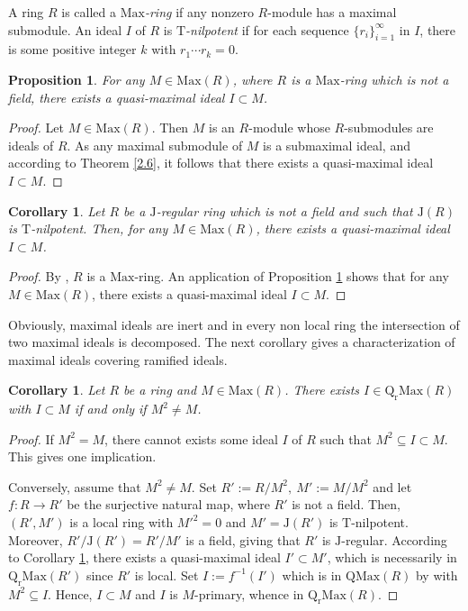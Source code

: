 \documentclass[12pt,leqno]{amsart}
\newtheorem{proposition}[theorem]{Proposition}
\newtheorem{corollary}[theorem]{Corollary}
\theoremstyle{definition}
\begin{document}
A ring $R$ is called a {\it $\mathrm{Max}$-ring} if any nonzero $R$-module has a maximal submodule. An ideal $I$ of $R$ is {\it $\mathrm T$-nilpotent} if for each sequence $\{r_i\}_{i=1}^{\infty}$ in $I$, there is some positive integer $k$ with $r_1\cdots r_k=0$. 

\begin{proposition}\label{2.15} For any $M\in\mathrm{Max}(R)$, where $ R$ is a $\mathrm{Max}$-ring which is not a field, there exists a quasi-maximal ideal $I\subset M$. 
\end{proposition}
\begin{proof} Let $M\in\mathrm{Max}(R)$. Then $M$ is an $R$-module whose $R$-submodules are ideals of $R$. As any maximal submodule of $M$ is a submaximal ideal, and according to Theorem \ref{2.6}, it follows that  there exists a quasi-maximal ideal $I\subset M$. 
\end{proof}

\begin{corollary}\label{2.16} Let $R$ be a $\mathrm J$-regular ring which is not a field and such that $\mathrm J(R)$ is $\mathrm T$-nilpotent. Then, for any $M\in\mathrm{Max}(R)$, there exists a quasi-maximal ideal $I\subset M$. 
\end{corollary}
\begin{proof} By \cite[Theorem, p.1135]{Ham}, $R$ is a $\mathrm {Max}$-ring. An application of Proposition \ref{2.15} shows that for any $M \in\mathrm{Max}(R)$,  there exists a quasi-maximal ideal $I\subset M$. 
\end{proof}

Obviously, maximal ideals are inert and in every non local ring the  intersection of two maximal ideals is decomposed. The next corollary gives a characterization of maximal ideals covering ramified ideals.

\begin{corollary}\label{2.19} Let $R$ be a ring and $M\in\mathrm{Max}(R)$. There exists $I\in\mathrm{Q_rMax}(R)$ with $I\subset M$ if and only if $M^2\neq M$. 
\end{corollary}
\begin{proof} If $M^2=M$, there cannot exists some ideal $I$ of $R$ such that $M^2\subseteq I\subset M$. This gives one implication.

Conversely, assume that $M^2\neq M$. Set $R':=R/M^2,\ M':=M/M^2$ and let $f:R\to R'$ be the surjective natural map, where $R'$ is not a field. Then, $(R',M')$ is a local ring with $M'^2=0$ and $M'=\mathrm J(R')$ is $\mathrm T$-nilpotent. Moreover, $R'/\mathrm J(R')=R'/M'$ is a field, giving that $R'$ is $\mathrm J$-regular. According to Corollary \ref{2.16}, there exists a quasi-maximal ideal $I'\subset M'$, which is necessarily in $\mathrm{Q_rMax}(R')$ since $R'$ is local. Set $I:=f^{-1}(I')$ which is in $\mathrm{QMax}(R)$ by \cite[Proposition 2]{AKKT} with $M^2\subseteq I$.  
 Hence, $I\subset M$ and $I$ is $M$-primary, whence in $\mathrm {Q_rMax} (R)$. 
\end{proof}
\end{document}
